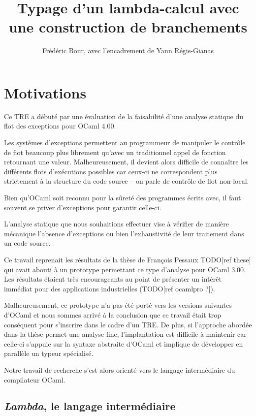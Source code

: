 \documentclass[12pt]{report}
\title{Typage d'un lambda-calcul avec une construction de branchements}
\author{Frédéric Bour, avec l'encadrement de Yann Régis-Gianas}
\newcommand\todo[1]{TODO[#1]}
\begin{document}
\maketitle

\chapter{Motivations}

Ce TRE a débuté par une évaluation de la faisabilité d'une analyse statique du
flot des exceptions pour OCaml 4.00. 

Les systèmes d'exceptions permettent au programmeur de manipuler le contrôle de
flot beaucoup plus librement qu'avec un traditionnel appel de fonction
retournant une valeur. Malheureusement, il devient alors difficile de connaître
les différents flots d'exécutions possibles car ceux-ci ne correspondent plus
strictement à la structure du code source -- on parle de contrôle de flot
non-local.

Bien qu'OCaml soit reconnu pour la sûreté des programmes écrits avec, il faut
souvent se priver d'exceptions pour garantir celle-ci.

L'analyse statique que nous souhaitions effectuer vise à vérifier de manière
mécanique l'absence d'exceptions ou bien l'exhaustivité de leur traitement dans
un code source.

Ce travail reprenait les résultats de la thèse de François Pessaux \todo{ref
these} qui avait abouti à un prototype permettant ce type d'analyse pour OCaml
3.00.  Les résultats étaient très encourageants au point de présenter un
intérêt immédiat pour des applications industrielles (\todo{ref ocamlpro ?}).

Malheureusement, ce prototype n'a pas été porté vers les versions suivantes
d'OCaml et nous sommes arrivé à la conclusion que ce travail était trop
conséquent pour s'inscrire dans le cadre d'un TRE.  De plus, si l'approche
abordée dans la thèse permet une analyse fine, l'implantation est difficile à
maintenir car celle-ci s'appuie sur la syntaxe abstraite d'OCaml et implique de
développer en parallèle un typeur spécialisé.

Notre travail de recherche s'est alors orienté vers le langage intermédiaire du
compilateur OCaml. 

\section{\emph{Lambda}, le langage intermédiaire}
\end{document}
